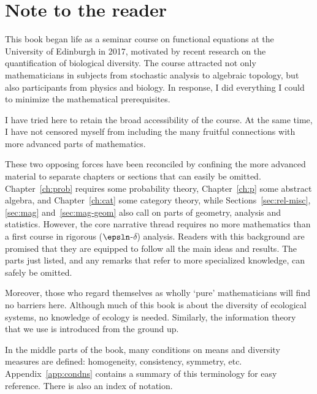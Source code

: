 \chapter*{Note to the reader}


This book began life as a seminar course on functional equations at the
University of Edinburgh in 2017, motivated by recent research on the
quantification of biological diversity.  The course attracted not only
mathematicians in subjects from stochastic analysis to algebraic topology,
but also participants from physics and biology.  In response, I did
everything I could to minimize the mathematical prerequisites.

I have tried here to retain the broad accessibility of the course.  At the
same time, I have not censored myself from including the many fruitful
connections with more advanced parts of mathematics.

These two opposing forces have been reconciled by confining the more
advanced material to separate chapters or sections that can easily be
omitted.  Chapter~\ref{ch:prob} requires some probability theory,
Chapter~\ref{ch:p} some abstract algebra, and Chapter~\ref{ch:cat} some
category theory, while Sections~\ref{sec:rel-misc}, \ref{sec:mag}
and~\ref{sec:mag-geom} also call on parts of geometry, analysis and
statistics.
% 
However, the core narrative thread requires no more mathematics than a
first course in rigorous ($\epsln$-$\delta$) analysis.  Readers with this
background are promised that they are equipped to follow all the main
ideas and results.  The parts just listed, and any remarks that refer to
more specialized knowledge, can safely be omitted.

Moreover, those who regard themselves as wholly `pure' mathematicians will
find no barriers here.  Although much of this book is about the diversity
of ecological systems, no knowledge of ecology is needed.  Similarly, the
information theory that we use is introduced from the ground up.

In the middle parts of the book, many conditions on means and diversity
measures are defined: homogeneity, consistency, symmetry, etc.
Appendix~\ref{app:condns} contains a summary of this terminology for easy
reference.  There is also an index of notation.

